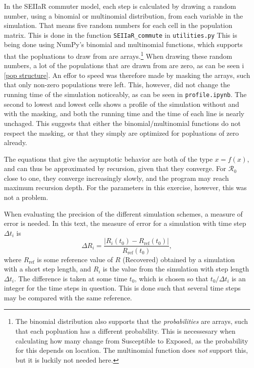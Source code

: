 \documentclass{article}
\begin{document}
    In the SEIIaR commuter model, each step is calculated by drawing a random number, using a binomial or multinomial distribution, from each variable in the simulation.
    That means five random numbers for each cell in the population matrix.
    This is done in the function \verb|SEIIaR_commute| in \verb|utilities.py|
    This is being done using NumPy's binomial and multinomial functions, which supports that the popluations to draw from are arrays.\footnote{The binomial distribution also supports that the \emph{probabilities} are arrays, such that each popluation has a different probability.
    This is necessesary when calculating how many change from Susceptible to Exposed, as the probability for this depends on location.
    The multinomial function does \emph{not} support this, but it is luckily not needed here.}
    When drawing these random numbers, a lot of the populations that are drawn from are zero, as can be seen i \autoref{pop structure}.
    An effor to speed was therefore made by masking the arrays, such that only non-zero populations were left.
    This, however, did not change the running time of the simulation noticeably, as can be seen in \verb|profile.ipynb|.
    The second to lowest and lowest cells shows a profile of the simulation without and with the masking, and both the running time and the time of each line is nearly unchaged.
    This suggests that either the binomial/multinomial functions do not respect the masking, or that they simply are optimized for popluations of zero already.


    The equations that give the asymptotic behavior are both of the type $x = f(x)$, and can thus be approximated by recursion, given that they converge. 
    For $\mathcal{R}_0$ close to one, they converge increasingly slowly, and the program may reach maximum recursion depth. 
    For the parameters in this exercise, however, this was not a problem.

    When evaluating the precision of the different simulation schemes, a measure of error is needed.
    In this text, the measure of error for a simulation with time step $\Delta t_i$ is
    \begin{equation*}
        \Delta R_i = \frac{|R_i(t_0) - R_{\mathrm{ref}}(t_0)|}{R_{\mathrm{ref}}(t_0)},
    \end{equation*}
    where $R_{\mathrm{ref}}$ is some reference value of $R$ (Recovered) obtained by a simulation with a short step length, and $R_i$ is the value from the simulation with step length $\Delta t_i$.
    The difference is taken at some time $t_0$, which is chosen so that $t_0/\Delta t_i$ is an integer for the time steps in question.
    This is done such that several time steps may be compared with the same reference.
    
\end{document}
